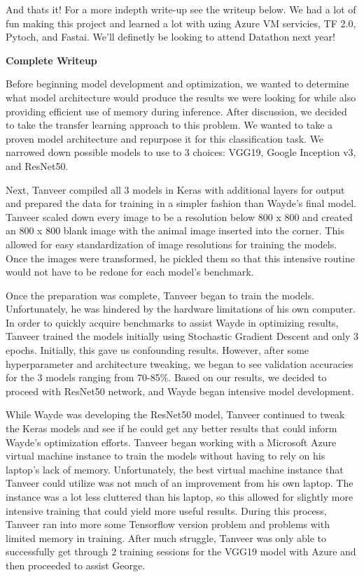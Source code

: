 \documentclass[11pt]{article}
\begin{document}
    And thats it! For a more indepth write-up see the writeup below. We had
a lot of fun making this project and learned a lot with uzing Azure VM
servicies, TF 2.0, Pytoch, and Fastai. We'll definetly be looking to
attend Datathon next year!

    \textbf{Complete Writeup}

Before beginning model development and optimization, we wanted to
determine what model architecture would produce the results we were
looking for while also providing efficient use of memory during
inference. After discussion, we decided to take the transfer learning
approach to this problem. We wanted to take a proven model architecture
and repurpose it for this classification task. We narrowed down possible
models to use to 3 choices: VGG19, Google Inception v3, and ResNet50.

Next, Tanveer compiled all 3 models in Keras with additional layers for
output and prepared the data for training in a simpler fashion than
Wayde's final model. Tanveer scaled down every image to be a resolution
below 800 x 800 and created an 800 x 800 blank image with the animal
image inserted into the corner. This allowed for easy standardization of
image resolutions for training the models. Once the images were
transformed, he pickled them so that this intensive routine would not
have to be redone for each model's benchmark.

Once the preparation was complete, Tanveer began to train the models.
Unfortunately, he was hindered by the hardware limitations of his own
computer. In order to quickly acquire benchmarks to assist Wayde in
optimizing results, Tanveer trained the models initially using
Stochastic Gradient Descent and only 3 epochs. Initially, this gave us
confounding results. However, after some hyperparameter and architecture
tweaking, we began to see validation accuracies for the 3 models ranging
from 70-85\%. Based on our results, we decided to proceed with ResNet50
network, and Wayde began intensive model development.

While Wayde was developing the ResNet50 model, Tanveer continued to
tweak the Keras models and see if he could get any better results that
could inform Wayde's optimization efforts. Tanveer began working with a
Microsoft Azure virtual machine instance to train the models without
having to rely on his laptop's lack of memory. Unfortunately, the best
virtual machine instance that Tanveer could utilize was not much of an
improvement from his own laptop. The instance was a lot less cluttered
than his laptop, so this allowed for slightly more intensive training
that could yield more useful results. During this process, Tanveer ran
into more some Tensorflow version problem and problems with limited
memory in training. After much struggle, Tanveer was only able to
successfully get through 2 training sessions for the VGG19 model with
Azure and then proceeded to assist George.
\end{document}
